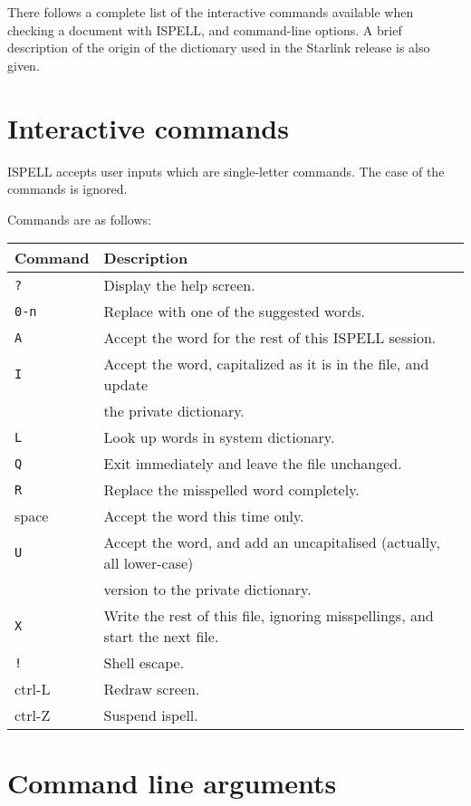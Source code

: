 \documentclass[noabs,nolof,twoside,11pt]{starlink}
\begin{document}
\begin{terminalv}
\end{terminalv}

There follows a complete list of the interactive commands available when
checking a document with ISPELL, and command-line options. A brief description
of the origin of the dictionary used in the Starlink release is also given.


\section{Interactive commands}

ISPELL accepts user inputs which are single-letter commands.  The
case of the commands is ignored.

Commands are as follows:

\begin{tabular}{ll}
Command & Description \\ \hline
\texttt{?    } & Display the help screen.\\
\texttt{0-n  } & Replace with one of the suggested words.\\
\texttt{A    } & Accept the word for the rest of this ISPELL session.\\
\texttt{I    } & Accept the word, capitalized as it is in the file, and update\\
            & the private dictionary.\\
\texttt{L    } & Look up words in system dictionary.\\
\texttt{Q    } & Exit immediately and leave the file unchanged.\\
\texttt{R    } & Replace the misspelled word completely.\\
space       & Accept the word this time only.\\
\texttt{U    } & Accept the word, and add an uncapitalised (actually, all
              lower-case)\\
            & version to the private dictionary.\\
\texttt{X    } & Write the rest of this file, ignoring misspellings, and start the
              next file.\\
\texttt{!    } & Shell escape.\\
ctrl-L      & Redraw screen.\\
ctrl-Z      & Suspend ispell.\\
\end{tabular}

\section{Command line arguments}
\end{document}
